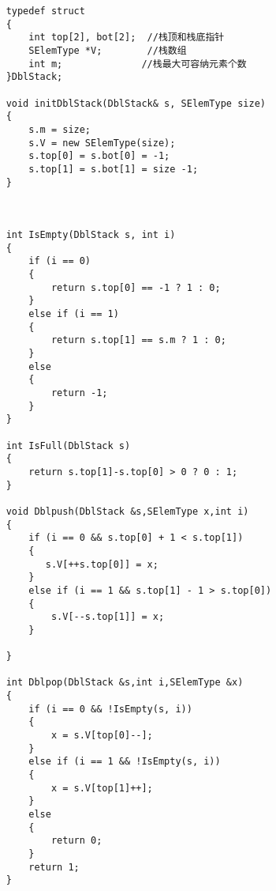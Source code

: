\documentclass{article}
\begin{document}
\begin{verbatim}
    typedef struct
    {
        int top[2], bot[2];  //栈顶和栈底指针
        SElemType *V;        //栈数组 
        int m;              //栈最大可容纳元素个数
    }DblStack;

    void initDblStack(DblStack& s, SElemType size)
    {
        s.m = size;
        s.V = new SElemType(size);
        s.top[0] = s.bot[0] = -1;
        s.top[1] = s.bot[1] = size -1;
    }



    int IsEmpty(DblStack s, int i)
    {
        if (i == 0)
        {
            return s.top[0] == -1 ? 1 : 0;
        }
        else if (i == 1)
        {
            return s.top[1] == s.m ? 1 : 0;
        }
        else
        {
            return -1;
        }
    }

    int IsFull(DblStack s)
    {
        return s.top[1]-s.top[0] > 0 ? 0 : 1;
    }

    void Dblpush(DblStack &s,SElemType x,int i)
    {
        if (i == 0 && s.top[0] + 1 < s.top[1])
        {
           s.V[++s.top[0]] = x;
        }
        else if (i == 1 && s.top[1] - 1 > s.top[0])
        {
            s.V[--s.top[1]] = x;
        }

    }

    int Dblpop(DblStack &s,int i,SElemType &x)
    {
        if (i == 0 && !IsEmpty(s, i))
        {
            x = s.V[top[0]--];
        }
        else if (i == 1 && !IsEmpty(s, i))
        {
            x = s.V[top[1]++];
        }
        else
        {
            return 0;
        }
        return 1;
    }

\end{verbatim}
\end{document}

